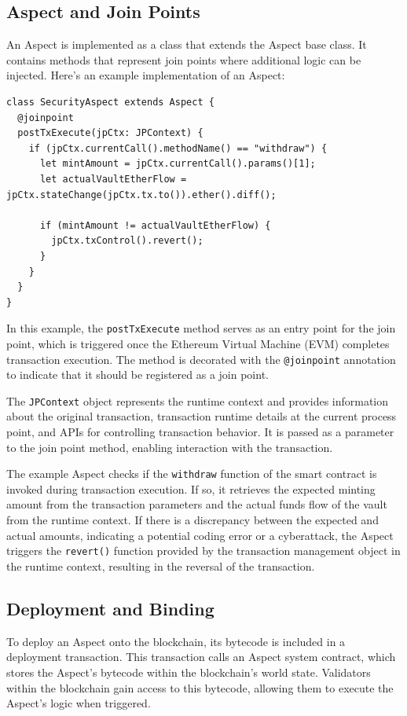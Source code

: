 \subsection{Aspect and Join Points}
An Aspect is implemented as a class that extends the Aspect base class. It contains methods that represent join points where additional logic can be injected. Here's an example implementation of an Aspect:

\begin{verbatim}
class SecurityAspect extends Aspect {
  @joinpoint
  postTxExecute(jpCtx: JPContext) {
    if (jpCtx.currentCall().methodName() == "withdraw") {
      let mintAmount = jpCtx.currentCall().params()[1];
      let actualVaultEtherFlow = jpCtx.stateChange(jpCtx.tx.to()).ether().diff();
      
      if (mintAmount != actualVaultEtherFlow) {
        jpCtx.txControl().revert();
      }
    }
  }
}
\end{verbatim}

In this example, the \texttt{postTxExecute} method serves as an entry point for the join point, which is triggered once the Ethereum Virtual Machine (EVM) completes transaction execution. The method is decorated with the \texttt{@joinpoint} annotation to indicate that it should be registered as a join point.

The \texttt{JPContext} object represents the runtime context and provides information about the original transaction, transaction runtime details at the current process point, and APIs for controlling transaction behavior. It is passed as a parameter to the join point method, enabling interaction with the transaction.

The example Aspect checks if the \texttt{withdraw} function of the smart contract is invoked during transaction execution. If so, it retrieves the expected minting amount from the transaction parameters and the actual funds flow of the vault from the runtime context. If there is a discrepancy between the expected and actual amounts, indicating a potential coding error or a cyberattack, the Aspect triggers the \texttt{revert()} function provided by the transaction management object in the runtime context, resulting in the reversal of the transaction.

\subsection{Deployment and Binding}
To deploy an Aspect onto the blockchain, its bytecode is included in a deployment transaction. This transaction calls an Aspect system contract, which stores the Aspect's bytecode within the blockchain's world state. Validators within the blockchain gain access to this bytecode, allowing them to execute the Aspect's logic when triggered.

